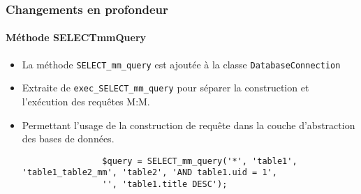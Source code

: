 \begin{frame}[fragile]
	\frametitle{Changements en profondeur}
	\framesubtitle{Méthode SELECTmmQuery}

	\lstset{basicstyle=\tiny\ttfamily}

	\begin{itemize}

		\item La méthode \texttt{SELECT\_mm\_query} est ajoutée à la classe \texttt{DatabaseConnection}

		\item Extraite de \texttt{exec\_SELECT\_mm\_query} pour séparer la construction et l'exécution des
			requêtes M:M.

		\item Permettant l'usage de la construction de requête dans la couche d'abstraction des bases de données.

			\begin{lstlisting}
				$query = SELECT_mm_query('*', 'table1', 'table1_table2_mm', 'table2', 'AND table1.uid = 1',
				'', 'table1.title DESC');
			\end{lstlisting}

	\end{itemize}

\end{frame}


